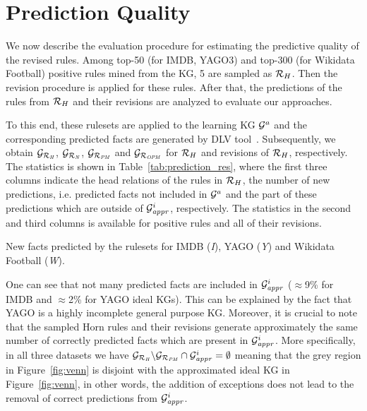 \section{Prediction Quality}

We now describe the evaluation procedure for estimating the predictive quality of the revised rules. Among top-50 (for IMDB, YAGO3) and top-300 (for Wikidata Football) positive rules mined from the KG, 5 are sampled as $\mathcal{R}_H$. Then the revision procedure is applied for these rules. After that, the predictions of the rules from $\mathcal{R}_H$ and their revisions are analyzed to evaluate our approaches.

To this end, these rulesets are applied to the learning KG $\mathcal{G}^a$ and the corresponding predicted facts are generated by DLV tool~\cite{dlv}. Subsequently, we obtain $\mathcal{G}_{\mathcal{R}_{\mathit{H}}}$, $\mathcal{G}_{\mathcal{R}_{\mathit{N}}}$, $\mathcal{G}_{\mathcal{R}_{\mathit{PM}}}$ and $\mathcal{G}_{\mathcal{R}_{\mathit{OPM}}}$ for $\mathcal{R}_H$ and revisions of $\mathcal{R}_H$, respectively. The statistics is shown in Table~\ref{tab:prediction_res}, where the first three columns indicate the head relations of the rules in $\mathcal{R}_H$, the number of new predictions, i.e. predicted facts not included in $\mathcal{G}^a$ and the part of these predictions which are outside of $\mathcal{G}^i_{\mathit{appr}}$, respectively. The statistics in the second and third columns is available for positive rules and all of their revisions.

\begin{table}[ht]
\centering

\smallskip
\caption{New facts predicted by the rulesets for IMDB (\textit{I}), YAGO (\textit{Y}) and Wikidata Football (\textit{W}).}
\label{tab:prediction_res}
\end{table}

One can see that not many predicted facts are included in $\mathcal{G}^i_{\mathit{appr}}$ ($\approx$9\% for IMDB and $\approx$2\% for YAGO ideal KGs). This can be explained by the fact that YAGO is a highly incomplete general purpose KG. Moreover, it is crucial to note that the sampled Horn rules and their revisions generate approximately the same number of correctly predicted facts which are present in $\mathcal{G}^i_{\mathit{appr}}$. More specifically, in all three datasets we have $\mathcal{G}_{\mathit{\mathcal{R}_H}}\backslash \mathcal{G}_{\mathit{\mathcal{R}_{PM}}} \cap \mathcal{G}^i_{\mathit{appr}}=\emptyset$ meaning that the grey region in Figure~\ref{fig:venn} is disjoint with the approximated ideal KG in Figure~\ref{fig:venn}, in other words, the addition of exceptions does not lead to the removal of correct predictions from $\mathcal{G}^i_{\mathit{appr}}$.

